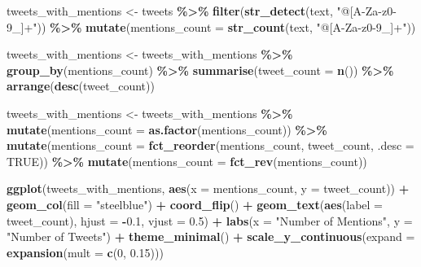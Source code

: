 \documentclass[
]{article}
\newenvironment{Shaded}{\begin{snugshade}}{\end{snugshade}}
\newcommand{\AttributeTok}[1]{\textcolor[rgb]{0.13,0.29,0.53}{#1}}
\newcommand{\ConstantTok}[1]{\textcolor[rgb]{0.56,0.35,0.01}{#1}}
\newcommand{\DecValTok}[1]{\textcolor[rgb]{0.00,0.00,0.81}{#1}}
\newcommand{\FloatTok}[1]{\textcolor[rgb]{0.00,0.00,0.81}{#1}}
\newcommand{\FunctionTok}[1]{\textcolor[rgb]{0.13,0.29,0.53}{\textbf{#1}}}
\newcommand{\NormalTok}[1]{#1}
\newcommand{\OtherTok}[1]{\textcolor[rgb]{0.56,0.35,0.01}{#1}}
\newcommand{\SpecialCharTok}[1]{\textcolor[rgb]{0.81,0.36,0.00}{\textbf{#1}}}
\newcommand{\StringTok}[1]{\textcolor[rgb]{0.31,0.60,0.02}{#1}}
\begin{document}
\begin{Shaded}
\begin{Highlighting}[]
\NormalTok{tweets\_with\_mentions }\OtherTok{\textless{}{-}}\NormalTok{ tweets }\SpecialCharTok{\%\textgreater{}\%}
  \FunctionTok{filter}\NormalTok{(}\FunctionTok{str\_detect}\NormalTok{(text, }\StringTok{"@[A{-}Za{-}z0{-}9\_]+"}\NormalTok{)) }\SpecialCharTok{\%\textgreater{}\%}
  \FunctionTok{mutate}\NormalTok{(}\AttributeTok{mentions\_count =} \FunctionTok{str\_count}\NormalTok{(text, }\StringTok{"@[A{-}Za{-}z0{-}9\_]+"}\NormalTok{))}

\NormalTok{tweets\_with\_mentions }\OtherTok{\textless{}{-}}\NormalTok{ tweets\_with\_mentions }\SpecialCharTok{\%\textgreater{}\%}
  \FunctionTok{group\_by}\NormalTok{(mentions\_count) }\SpecialCharTok{\%\textgreater{}\%}
  \FunctionTok{summarise}\NormalTok{(}\AttributeTok{tweet\_count =} \FunctionTok{n}\NormalTok{()) }\SpecialCharTok{\%\textgreater{}\%}
  \FunctionTok{arrange}\NormalTok{(}\FunctionTok{desc}\NormalTok{(tweet\_count))}

\NormalTok{tweets\_with\_mentions }\OtherTok{\textless{}{-}}\NormalTok{ tweets\_with\_mentions }\SpecialCharTok{\%\textgreater{}\%}
  \FunctionTok{mutate}\NormalTok{(}\AttributeTok{mentions\_count =} \FunctionTok{as.factor}\NormalTok{(mentions\_count)) }\SpecialCharTok{\%\textgreater{}\%}
  \FunctionTok{mutate}\NormalTok{(}\AttributeTok{mentions\_count =} \FunctionTok{fct\_reorder}\NormalTok{(mentions\_count, tweet\_count, }\AttributeTok{.desc =} \ConstantTok{TRUE}\NormalTok{)) }\SpecialCharTok{\%\textgreater{}\%}
  \FunctionTok{mutate}\NormalTok{(}\AttributeTok{mentions\_count =} \FunctionTok{fct\_rev}\NormalTok{(mentions\_count))}

\FunctionTok{ggplot}\NormalTok{(tweets\_with\_mentions, }\FunctionTok{aes}\NormalTok{(}\AttributeTok{x =}\NormalTok{ mentions\_count, }\AttributeTok{y =}\NormalTok{ tweet\_count)) }\SpecialCharTok{+}
  \FunctionTok{geom\_col}\NormalTok{(}\AttributeTok{fill =} \StringTok{"steelblue"}\NormalTok{) }\SpecialCharTok{+}
  \FunctionTok{coord\_flip}\NormalTok{() }\SpecialCharTok{+}
  \FunctionTok{geom\_text}\NormalTok{(}\FunctionTok{aes}\NormalTok{(}\AttributeTok{label =}\NormalTok{ tweet\_count), }\AttributeTok{hjust =} \SpecialCharTok{{-}}\FloatTok{0.1}\NormalTok{, }\AttributeTok{vjust =} \FloatTok{0.5}\NormalTok{) }\SpecialCharTok{+}
  \FunctionTok{labs}\NormalTok{(}\AttributeTok{x =} \StringTok{"Number of Mentions"}\NormalTok{, }\AttributeTok{y =} \StringTok{"Number of Tweets"}\NormalTok{) }\SpecialCharTok{+}
  \FunctionTok{theme\_minimal}\NormalTok{() }\SpecialCharTok{+}
  \FunctionTok{scale\_y\_continuous}\NormalTok{(}\AttributeTok{expand =} \FunctionTok{expansion}\NormalTok{(}\AttributeTok{mult =} \FunctionTok{c}\NormalTok{(}\DecValTok{0}\NormalTok{, }\FloatTok{0.15}\NormalTok{)))}
\end{Highlighting}
\end{Shaded}
\end{document}

